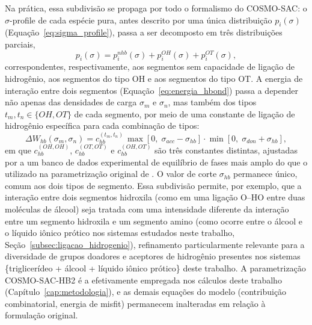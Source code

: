 Na prática, essa subdivisão se propaga por todo o formalismo do COSMO-SAC: o $\sigma$-profile de cada espécie pura, antes descrito por uma única distribuição $p_i(\sigma)$ (Equação~\ref{eq:sigma_profile}), passa a ser decomposto em três distribuições parciais,
\begin{equation}
    p_i(\sigma) = p_i^{nhb}(\sigma) + p_i^{OH}(\sigma) + p_i^{OT}(\sigma),
    \label{eq:sigma_profile_hb2}
\end{equation}
correspondentes, respectivamente, aos segmentos sem capacidade de ligação de hidrogênio, aos segmentos do tipo OH e aos segmentos do tipo OT. A energia de interação entre dois segmentos (Equação~\ref{eq:energia_hbond}) passa a depender não apenas das densidades de carga $\sigma_m$ e $\sigma_n$, mas também dos tipos $t_m, t_n \in \{OH, OT\}$ de cada segmento, por meio de uma constante de ligação de hidrogênio específica para cada combinação de tipos:
\begin{equation}
    \Delta W_{hb}(\sigma_m, \sigma_n) =
    c_{hb}^{(t_m, t_n)} \,
    \max\!\left[0, \;\sigma_{acc} - \sigma_{hb}\right]
    \cdot
    \min\!\left[0, \;\sigma_{don} + \sigma_{hb}\right],
    \label{eq:energia_hbond_hb2}
\end{equation}
em que $c_{hb}^{(OH,OH)}$, $c_{hb}^{(OT,OT)}$ e $c_{hb}^{(OH,OT)}$ são três constantes distintas, ajustadas por  a um banco de dados experimental de equilíbrio de fases mais amplo do que o utilizado na parametrização original de . O valor de corte $\sigma_{hb}$ permanece único, comum aos dois tipos de segmento. Essa subdivisão permite, por exemplo, que a interação entre dois segmentos hidroxila (como em uma ligação O–H\textperiodcentered\textperiodcentered\textperiodcentered O entre duas moléculas de álcool) seja tratada com uma intensidade diferente da interação entre um segmento hidroxila e um segmento amino (como ocorre entre o álcool e o líquido iônico prótico nos sistemas estudados neste trabalho, Seção~\ref{subsec:ligacao_hidrogenio}), refinamento particularmente relevante para a diversidade de grupos doadores e aceptores de hidrogênio presentes nos sistemas \{triglicerídeo + álcool + líquido iônico prótico\} deste trabalho. A parametrização COSMO-SAC-HB2 é a efetivamente empregada nos cálculos deste trabalho (Capítulo~\ref{cap:metodologia}), e as demais equações do modelo (contribuição combinatorial, energia de misfit) permanecem inalteradas em relação à formulação original.


